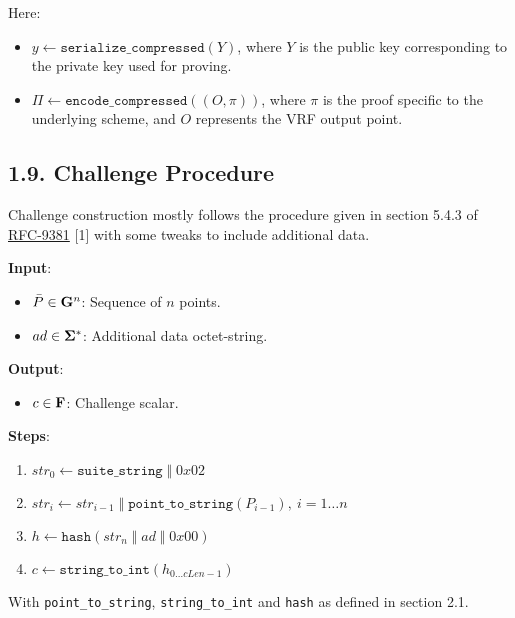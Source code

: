\documentclass[
]{article}
\providecommand{\tightlist}{%
  \setlength{\itemsep}{0pt}\setlength{\parskip}{0pt}}
\begin{document}
Here:

\begin{itemize}
\tightlist
\item
  \(y \gets \texttt{serialize\_compressed}(Y)\), where \(Y\) is the
  public key corresponding to the private key used for proving.
\item
  \(\Pi \gets \texttt{encode\_compressed}((O, \pi))\), where \(\pi\) is
  the proof specific to the underlying scheme, and \(O\) represents the
  VRF output point.
\end{itemize}

\subsection{1.9. Challenge Procedure}\label{challenge-procedure}

Challenge construction mostly follows the procedure given in section
5.4.3 of \href{https://datatracker.ietf.org/doc/rfc9381}{RFC-9381}
{[}1{]} with some tweaks to include additional data.

\textbf{Input}:

\begin{itemize}
\tightlist
\item
  \(\bar{P} \in \bold{G}^n\): Sequence of \(n\) points.
\item
  \(ad \in \bold{\Sigma}^*\): Additional data octet-string.
\end{itemize}

\textbf{Output}:

\begin{itemize}
\tightlist
\item
  \(c \in \bold{F}\): Challenge scalar.
\end{itemize}

\textbf{Steps}:

\begin{enumerate}
\def\labelenumi{\arabic{enumi}.}
\tightlist
\item
  \(str_0 \gets \texttt{suite\_string}\;\Vert\;0x02\)
\item
  \(str_i \gets str_{i-1}\;\Vert\;\texttt{point\_to\_string}(P_{i-1}),\ i = 1 \dots n\)
\item
  \(h \gets \texttt{hash}(str_n\;\Vert\;ad\;\Vert\;0x00)\)
\item
  \(c \gets \texttt{string\_to\_int}(h_{0 \dots cLen - 1})\)
\end{enumerate}

With \texttt{point\_to\_string}, \texttt{string\_to\_int} and
\texttt{hash} as defined in section 2.1.
\end{document}
